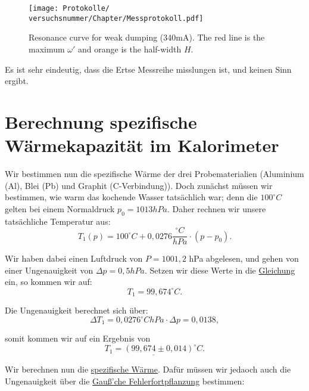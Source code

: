 \onecolumn
\begin{figure}
    \centering
    \texttt{[image: Protokolle/\\versuchsnummer/Chapter/Messprotokoll.pdf]}
    \caption{Resonance curve for weak dumping (340mA). The red line is the maximum $\omega'$ and orange is the half-width $H$.}
    \label{fig:temp_against_time}
\end{figure}
\twocolumn


Es ist sehr eindeutig, dass die Ertse Messreihe misslungen ist, und keinen Sinn ergibt.

\section{Berechnung spezifische Wärmekapazität im Kalorimeter}
Wir bestimmen nun die spezifische Wärme der drei Probematerialien (Aluminium (Al), Blei (Pb) und Graphit (C-Verbindung)). 
Doch zunächst müssen wir bestimmen, wie warm das kochende Wasser tatsächlich war; denn die $100^\circ C$ gelten bei einem Normaldruck $p_0 = 1013 hPa$.
Daher rechnen wir unsere tatsächliche Temperatur aus:
\begin{equation}
    T_1(p) = 100^\circ C + 0,0276 \frac{^\circ C}{hPa} \cdot (p-p_0).
    \label{eq:temp_corecctur}
\end{equation}

Wir haben dabei einen Luftdruck von $P = 1001,2$ hPa abgelesen, und gehen von einer Ungenauigkeit von $\Delta p = 0,5 hPa$.
Setzen wir diese Werte in die \hyperref[eq:temp_corecctur]{Gleichung} ein, so kommen wir auf:
\begin{equation}    
    T_1 = 99,674 ^\circ C.
\end{equation}

Die Ungenauigkeit berechnet sich über:
\begin{equation}
    \Delta T_1 = 0,0276 {^\circ C}{hPa} \cdot \Delta p = 0,0138,
\end{equation}

somit kommen wir auf ein Ergebnis von
\begin{equation}
    \underline{T_1 = (99,674 \pm 0,014)^\circ C}.
\end{equation}

Wir berechnen nun die \hyperref[eq:spezifische_waermekapazitaet]{spezifische Wärme}. Dafür müssen wir jedaoch auch 
die Ungenauigkeit über die \hyperref[eq:gauss_fehlfortpflanzung]{Gauß'che Fehlerfortpflanzung} bestimmen:

